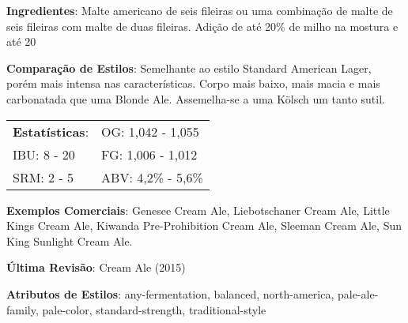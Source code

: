 \textbf{Ingredientes}: Malte americano de seis fileiras ou uma combinação de malte de seis fileiras com malte de duas fileiras. Adição de até 20\% de milho na mostura e até 20%

\textbf{Comparação de Estilos}: Semelhante ao estilo Standard American Lager, porém mais intensa nas características. Corpo mais baixo, mais macia e mais carbonatada que uma Blonde Ale. Assemelha-se a uma Kölsch um tanto sutil.

\begin{tabular}{@{}p{35mm}p{35mm}@{}}
  \textbf{Estatísticas}: & OG: 1,042 - 1,055 \\
  IBU: 8 - 20  & FG: 1,006 - 1,012 \\
  SRM: 2 - 5  & ABV: 4,2\% - 5,6\%
\end{tabular}

\textbf{Exemplos Comerciais}: Genesee Cream Ale, Liebotschaner Cream Ale, Little Kings Cream Ale, Kiwanda Pre-Prohibition Cream Ale, Sleeman Cream Ale, Sun King Sunlight Cream Ale.

\textbf{Última Revisão}: Cream Ale (2015)

\textbf{Atributos de Estilos}: any-fermentation, balanced, north-america, pale-ale-family, pale-color, standard-strength, traditional-style
